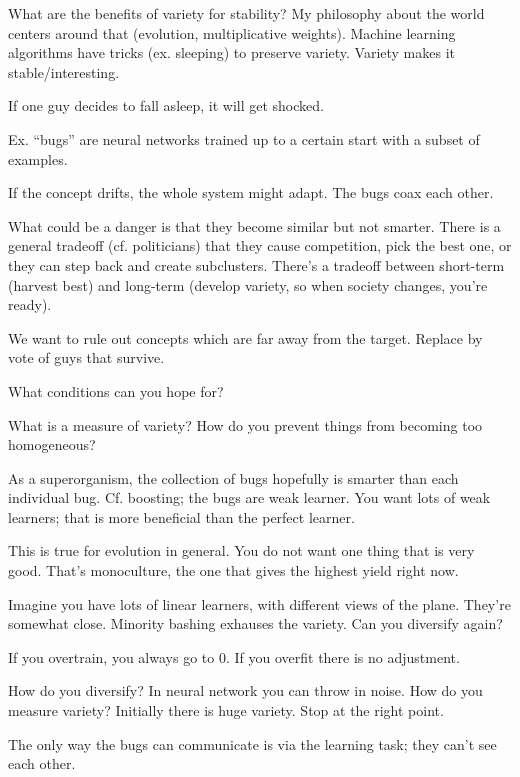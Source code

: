 What are the benefits of variety for stability? My philosophy about the world centers around that (evolution, multiplicative weights). Machine learning algorithms have tricks (ex. sleeping) to preserve variety. Variety makes it stable/interesting.

If one guy decides to fall asleep, it will get shocked. 

Ex. ``bugs'' are neural networks trained up to a certain start with a subset of examples. 

If the concept drifts, the whole system might adapt. The bugs coax each other.

What could be a danger is that they become similar but not smarter. There is a general tradeoff (cf. politicians) that they cause competition, pick the best one, or they can step back and create subclusters. There's a tradeoff between short-term (harvest best) and long-term (develop variety, so when society changes, you're ready).

We want to rule out concepts which are far away from the target. Replace by vote of guys that survive.

What conditions can you hope for? 

What is a measure of variety? How do you prevent things from becoming too homogeneous? 

As a superorganism, the collection of bugs hopefully is smarter than each individual bug. Cf. boosting; the bugs are weak learner. You want lots of weak learners; that is more beneficial than the perfect learner.

This is true for evolution in general. You do not want one thing that is very good. That's monoculture, the one that gives the highest yield right now.

Imagine you have lots of linear learners, with different views of the plane. They're somewhat close. Minority bashing exhauses the variety. Can you diversify again?

If you overtrain, you always go to 0. If you overfit there is no adjustment.

How do you diversify? In neural network you can throw in noise.
How do you measure variety? Initially there is huge variety. Stop at the right point.

The only way the bugs can communicate is via the learning task; they can't see each other. 

